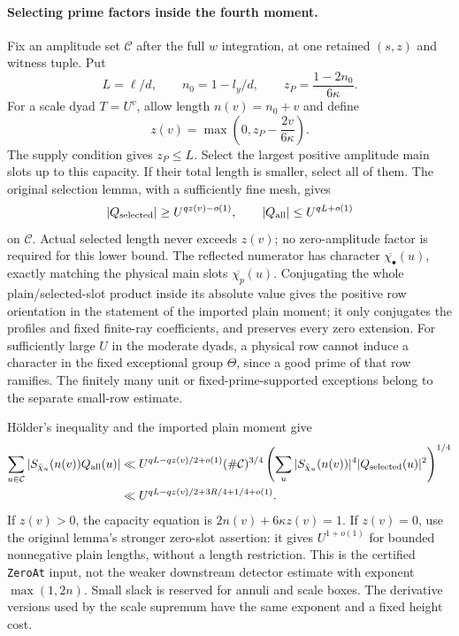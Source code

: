 \paragraph{Selecting prime factors inside the fourth moment.}
Fix an amplitude set $\mathcal C$ after the full $w$ integration, at
one retained $(s,z)$ and witness tuple.  Put
\[
 L=\ell/d,\qquad n_0=1-l_y/d,
 \qquad z_P=\frac{1-2n_0}{6\kappa}.
\]
For a scale dyad $T=U^v$, allow length $n(v)=n_0+v$ and define
\[
 z(v)=\max\left(0,z_P-\frac{2v}{6\kappa}\right).
\]
The supply condition gives $z_P\le L$.  Select the largest positive
amplitude main slots up to this capacity.  If their total length is
smaller, select all of them.  The original selection lemma, with a
sufficiently fine mesh, gives
\[
 |Q_{\rm selected}|\ge U^{qz(v)-o(1)},
 \qquad |Q_{\rm all}|\le U^{qL+o(1)}
\]
on $\mathcal C$.  Actual selected length never exceeds $z(v)$; no
zero-amplitude factor is required for this lower bound.  The reflected
numerator has character $\overline{\chi_\bullet}(u)$, exactly matching
the physical main slots $\overline{\chi_p}(u)$.  Conjugating the whole
plain/selected-slot product inside its absolute value gives the positive
row orientation in the statement of the imported plain moment; it only
conjugates the profiles and fixed finite-ray coefficients, and preserves
every zero extension.  For sufficiently large $U$ in the moderate
dyads, a physical row cannot induce a character in the fixed exceptional
group $\Theta$, since a good prime of that row ramifies.  The finitely
many unit or fixed-prime-supported exceptions belong to the separate
small-row estimate.

H\"older's inequality and the imported plain moment give
\begin{align*}
 \sum_{u\in\mathcal C}|S_{\bar\chi_u}(n(v))Q_{\rm all}(u)|
 &\ll U^{qL-qz(v)/2+o(1)}(\#\mathcal C)^{3/4}
 \left(\sum_u |S_{\bar\chi_u}(n(v))|^4
                     |Q_{\rm selected}(u)|^2\right)^{1/4}\\
 &\ll U^{qL-qz(v)/2+3R/4+1/4+o(1)}.
\end{align*}
If $z(v)>0$, the capacity equation is $2n(v)+6\kappa z(v)=1$.
If $z(v)=0$, use the original lemma's stronger zero-slot assertion:
it gives $U^{1+o(1)}$ for bounded nonnegative plain lengths, without
a length restriction. This is the certified \texttt{ZeroAt} input,
not the weaker downstream detector estimate with exponent
$\max(1,2n)$. Small slack is reserved for annuli and scale boxes.
The derivative versions used by the scale supremum have the same
exponent and a fixed height cost.

